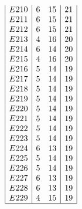 \documentclass[12pt]{article}
\begin{document}
\begin{multicols}{3}
\begin{equation*}
\begin{array}{|c|cc|c|}
E210&6&15&21\\
E211&6&15&21\\
E212&6&15&21\\
E213&4&16&20\\
E214&6&14&20\\
E215&4&16&20\\
E216&5&14&19\\
E217&5&14&19\\
E218&5&14&19\\
E219&5&14&19\\
E220&5&14&19\\
E221&5&14&19\\
E222&5&14&19\\
E223&5&14&19\\
E224&6&13&19\\
E225&5&14&19\\
E226&5&14&19\\
E227&6&13&19\\
E228&6&13&19\\
E229&4&15&19\\
\hline
\end{array}
\end{equation*}
\end{multicols}
\end{document}
